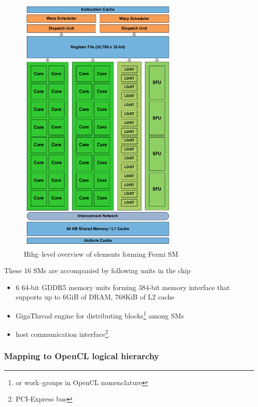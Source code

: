 \begin{figure}[htb]
  \begin{center}
    \includegraphics[width=0.7\textwidth]{chapters/opencl/fermism.png}
  \end{center}
  \caption{Hihg--level overview of elements forming Fermi SM}
  \label{fig:fermism}
\end{figure}

These 16 SMs are accompanied by following units in the chip
\begin{itemize}
  \item 6 64-bit GDDR5 memory units forming 384-bit
memory interface that supports up to 6GiB of DRAM, 768KiB of L2 cache
  \item GigaThread engine for distributing blocks\footnote{or work--groups in OpenCL nomenclature}
  among SMs
  \item host communication interface\footnote{PCI-Express bus}.
\end{itemize}

\subsubsection{Mapping to OpenCL logical hierarchy}

